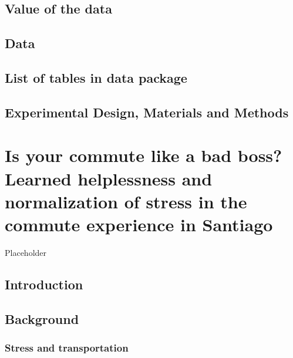 \documentclass[
11pt, %
oneside, %
english, %
singlespacing, %
]{macthesis} %
\begin{document}
\hypertarget{value-of-the-data}{%
\section{Value of the data}\label{value-of-the-data}}

\hypertarget{data}{%
\section{Data}\label{data}}

\hypertarget{list-of-tables-in-data-package}{%
\section{List of tables in data package}\label{list-of-tables-in-data-package}}

\hypertarget{experimental-design-materials-and-methods}{%
\section{Experimental Design, Materials and Methods}\label{experimental-design-materials-and-methods}}

\hypertarget{is-your-commute-like-a-bad-boss-learned-helplessness-and-normalization-of-stress-in-the-commute-experience-in-santiago}{%
\chapter{Is your commute like a bad boss? Learned helplessness and normalization of stress in the commute experience in Santiago}\label{is-your-commute-like-a-bad-boss-learned-helplessness-and-normalization-of-stress-in-the-commute-experience-in-santiago}}

Placeholder

\hypertarget{introduction-3}{%
\section{Introduction}\label{introduction-3}}

\hypertarget{background-1}{%
\section{Background}\label{background-1}}

\hypertarget{stress-and-transportation}{%
\subsection{Stress and transportation}\label{stress-and-transportation}}
\end{document}
